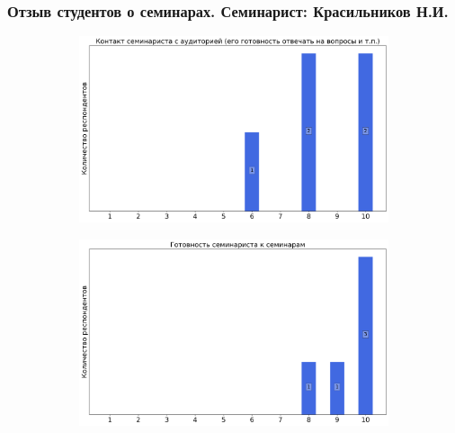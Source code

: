     \subsubsection{Отзыв студентов о семинарах. Семинарист: Красильников Н.И.}
        \begin{figure}[H]
            \centering
            \begin{subfigure}[b]{0.45\textwidth}
                \centering
                \includegraphics[width=\textwidth]{images/2 course/Компьютерные технологии/seminarists-marks-Красильников Н.И.-0.png}
            \end{subfigure}
            \begin{subfigure}[b]{0.45\textwidth}
                \centering
                \includegraphics[width=\textwidth]{images/2 course/Компьютерные технологии/seminarists-marks-Красильников Н.И.-1.png}
            \end{subfigure}
            \begin{subfigure}[b]{0.45\textwidth}
                \centering

\end{subfigure}
\end{figure}
